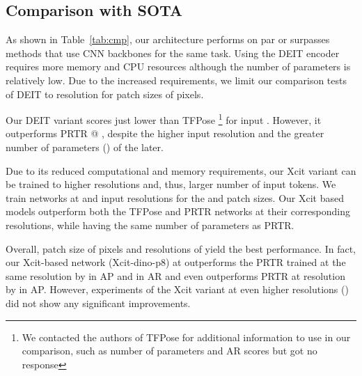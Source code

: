 \documentclass[runningheads]{llncs}
\begin{document}
\subsection{Comparison with SOTA}
As shown in Table~\ref{tab:cmp}, our architecture performs on par or surpasses methods that use CNN backbones for the same task. Using the DEIT encoder requires more memory and CPU resources although the number of parameters is relatively low. Due to the increased requirements, we limit our comparison tests of DEIT to  resolution for patch sizes of  pixels. 

Our DEIT variant scores just  lower than TFPose
\footnote{We contacted the authors of TFPose for additional information to use in our comparison, such as number of parameters and AR scores but got no response}
for input . 
However, it outperforms PRTR @ , despite the higher input resolution and the 
greater number of parameters () of the later.

Due to its reduced computational and memory requirements, our Xcit variant  can be trained 
to higher resolutions and, thus, larger number of input tokens. We train networks at  and  input resolutions for the   and  patch sizes. Our Xcit based models outperform both the TFPose and PRTR networks at their corresponding resolutions, while having the same number of parameters as PRTR. 

Overall, patch size of  pixels and resolutions of  yield the best performance. In fact, our Xcit-based network (Xcit-dino-p8) at  outperforms the PRTR trained at the same resolution by  in AP and  in AR and even outperforms PRTR at resolution  by  in AP. However, experiments of the Xcit variant at even higher resolutions () did not show any significant improvements.
\end{document}
